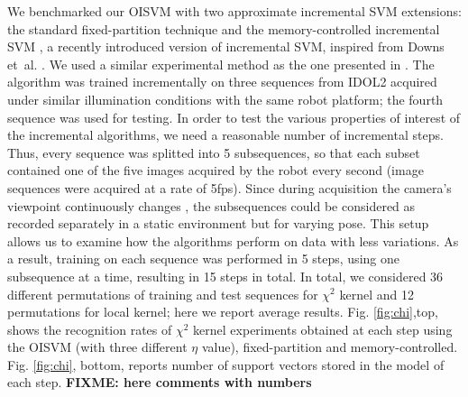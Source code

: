 We benchmarked our OISVM with two approximate incremental SVM extensions:
the standard fixed-partition technique \cite{ijcai99} and the memory-controlled incremental
SVM \cite{luo:icra07}, a recently introduced version of incremental SVM, 
 inspired from Downs et~al. \cite{DownsGM01}. We used a similar experimental
method as the one presented in \cite{luo:icra07}. The algorithm was trained incrementally on
three sequences from IDOL2 acquired under similar illumination conditions with the same robot
platform; the fourth sequence was used for testing. In order to test the various properties of
interest of the incremental algorithms, we need a reasonable number of incremental steps.
Thus, every sequence was splitted into 5 subsequences, so that each subset contained one of the
five images acquired by the robot every second (image sequences were acquired at a rate of
5fps). Since during acquisition the camera's viewpoint continuously changes \cite{luo:icra07},
the subsequences could be considered as recorded separately in a static environment but for
varying pose. This setup allows us to examine how the algorithms perform on data with less
variations. As a result, training on each sequence was performed in 5 steps, using one subsequence
at a time, resulting in 15 steps in total. In total, we considered 36 different permutations
of training and test sequences for $\chi^2$ kernel and 12 permutations for local kernel; here
we report average results. Fig. \ref{fig:chi},top, shows the recognition rates of $\chi^2$ kernel experiments
obtained at each step using the OISVM (with three different $\eta$ value), fixed-partition and
memory-controlled. Fig. \ref{fig:chi}, bottom, reports number of support vectors stored in the model of
each step. \textbf{FIXME: here comments with numbers}

